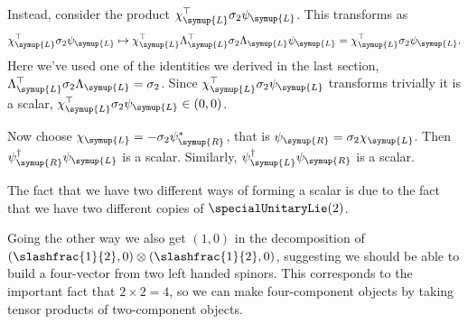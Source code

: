 \documentclass[fleqn]{NotesClass}
\newcommand{\hermit}{\dagger}
\newcommand{\trans}{\top}
\newcommand{\Left}{\symup{L}}
\newcommand{\Right}{\symup{R}}
\begin{document}
    Instead, consider the product \(\chi_{\Left}^\trans \sigma_2 \psi_{\Left}\).
    This transforms as
    \begin{equation}
        \chi_{\Left}^\trans \sigma_2 \psi_{\Left} \mapsto \chi_{\Left}^\trans \Lambda_{\Left}^{\trans} \sigma_2 \Lambda_{\Left} \psi_{\Left} = \chi_{\Left}^\trans \sigma_2 \psi_{\Left}.
    \end{equation}
    Here we've used one of the identities we derived in the last section, \(\Lambda_{\Left}^{\trans} \sigma_2 \Lambda_{\Left} = \sigma_2\).
    Since \(\chi_{\Left}^\trans \sigma_2 \psi_{\Left}\) transforms trivially it is a scalar, \(\chi_{\Left}^\trans \sigma_2 \psi_{\Left} \in (0, 0)\).
    
    Now choose \(\chi_{\Left} = -\sigma_2\psi_{\Right}^*\), that is \(\psi_{\Right} = \sigma_2\chi_{\Left}\).
    Then \(\psi_{\Right}^\hermit\psi_{\Left}\) is a scalar.
    Similarly, \(\psi_{\Left}^\hermit \psi_{\Right}\) is a scalar.
    
    The fact that we have two different ways of forming a scalar is due to the fact that we have two different copies of \(\specialUnitaryLie(2)\).
    
    Going the other way we also get \((1, 0)\) in the decomposition of \((\slashfrac{1}{2}, 0) \otimes (\slashfrac{1}{2}, 0)\), suggesting we should be able to build a four-vector from two left handed spinors.
    This corresponds to the important fact that \(2 \times 2 = 4\), so we can make four-component objects by taking tensor products of two-component objects.
    
\end{document}
